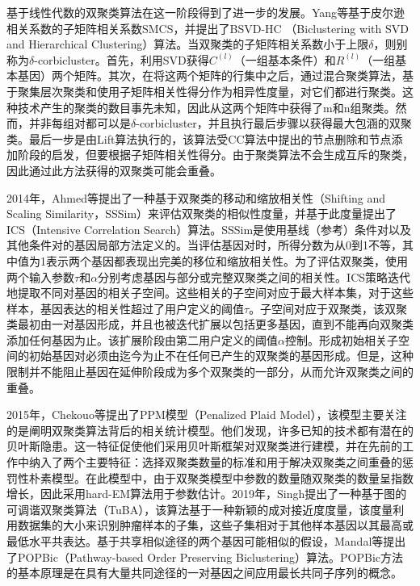     基于线性代数的双聚类算法在这一阶段得到了进一步的发展。Yang\cite{yang2010finding}等基于皮尔逊相关系数的子矩阵相关系数SMCS，并提出了BSVD-HC （Biclustering with SVD and Hierarchical Clustering）算法。当双聚类的子矩阵相关系数小于上限$\delta$，则别称为$\delta$-corbicluster。首先，利用SVD获得$C^{(l)}$（一组基本条件）和$R^{(l)}$（一组基本基因）两个矩阵。其次，在将这两个矩阵的行集中之后，通过混合聚类算法，基于聚集层次聚类和使用子矩阵相关性得分作为相异性度量，对它们都进行聚类。这种技术产生的聚类的数目事先未知，因此从这两个矩阵中获得了m和n组聚类。然而，并非每组对都可以是$\delta$-corbicluster，并且执行最后步骤以获得最大包涵的双聚类。最后一步是由Lift算法执行的，该算法受CC算法中提出的节点删除和节点添加阶段的启发，但要根据子矩阵相关性得分。由于聚类算法不会生成互斥的聚类，因此通过此方法获得的双聚类可能会重叠。
    
    2014年，Ahmed\cite{ahmed2014shifting}等提出了一种基于双聚类的移动和缩放相关性（Shifting and Scaling Similarity，SSSim）来评估双聚类的相似性度量，并基于此度量提出了ICS（Intensive Correlation Search）算法。SSSim是使用基线（参考）条件对以及其他条件对的基因局部方法定义的。当评估基因对时，所得分数为从0到1不等，其中值为1表示两个基因都表现出完美的移位和缩放相关性。为了评估双聚类，使用两个输入参数$\tau$和$\alpha$分别考虑基因与部分或完整双聚类之间的相关性。ICS策略迭代地提取不同对基因的相关子空间。这些相关的子空间对应于最大样本集，对于这些样本，基因表达的相关性超过了用户定义的阈值$\tau$。子空间对应于双聚类，该双聚类最初由一对基因形成，并且也被迭代扩展以包括更多基因，直到不能再向双聚类添加任何基因为止。该扩展阶段由第二用户定义的阈值$\alpha$控制。形成初始相关子空间的初始基因对必须由迄今为止不在任何已产生的双聚类的基因形成。但是，这种限制并不能阻止基因在延伸阶段成为多个双聚类的一部分，从而允许双聚类之间的重叠。

    2015年，Chekouo\cite{chekouo2015penalized}等提出了PPM模型（Penalized Plaid Model），该模型主要关注的是阐明双聚类算法背后的相关统计模型。他们发现，许多已知的技术都有潜在的贝叶斯隐患。这一特征促使他们采用贝叶斯框架对双聚类进行建模，并在先前的工作中纳入了两个主要特征：选择双聚类数量的标准和用于解决双聚类之间重叠的惩罚性朴素模型。在此模型中，由于双聚类模型中参数的数量随双聚类的数量呈指数增长，因此采用hard-EM算法用于参数估计。2019年，Singh\cite{singh2019tunable}提出了一种基于图的可调谐双聚类算法（TuBA），该算法基于一种新颖的成对接近度度量，该度量利用数据集的大小来识别肿瘤样本的子集，这些子集相对于其他样本基因以其最高或最低水平共表达。基于共享相似途径的两个基因可能相似的假设，Mandal\cite{mandal2020popbic}等提出了POPBic（Pathway-based Order Preserving Biclustering）算法。POPBic方法的基本原理是在具有大量共同途径的一对基因之间应用最长共同子序列的概念。

